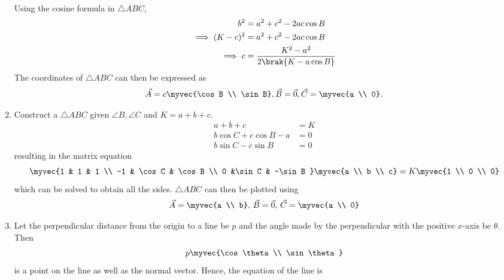 \begin{enumerate}[label=\thesubsubsection.\arabic*.,ref=\thesubsubsection.\theenumi]
	\\
	\solution 
	Using the cosine formula in  $\triangle ABC$,
\begin{align}
	{b}^2&= {a}^2 + {c}^2 - 2ac\cos{B}
\\
\implies	(K-c)^2 &= {a}^2 + c^2- 2  a  c\cos{B}
\\
\implies
	c &=
	\frac{K^2-a^2}{2\brak{K- a  \cos{B}}}
		\label{eq:9/11/2/1}
\end{align}
The coordinates of $\triangle ABC$ can then be expressed as
\begin{align}
		\label{eq:9/11/2/1-final}
	\vec{A}=c\myvec{\cos B \\ \sin B},
	\vec{B} = \vec{0},
	\vec{C} =\myvec{a \\ 0}.
\end{align}
\item Construct a $\triangle ABC$ given $\angle B, \angle C$ and $K = a+b+c$.
	\\
	\solution
	\begin{align}
a+b+c &= K \\
b\cos C + c \cos B -a &=0 \\
b\sin C - c \sin B &=0
\end{align}
resulting in the matrix equation
\begin{align}
		\label{eq:9/11/2/4}
	\myvec{1 & 1 & 1 \\ -1 & \cos C & \cos B  \\ 0 &\sin C & -\sin B } \myvec{a \\ b \\ c} = K \myvec{1 \\ 0 \\ 0}
\end{align}
which can be solved to obtain all the sides.  $\triangle ABC$ can then be plotted using
\begin{align}
\vec{A} = \myvec{a \\ b},\,
\vec{B} = \vec{0},\, 
\vec{C} = \myvec{a \\ 0}
		\label{eq:9/11/2/4-final}
\end{align}
\item Let the perpendicular distance from the origin to a line be $p$ and the angle made by the perpendicular with the positive $x$-axis be $\theta$.
	Then 
\begin{align}
	p\myvec{\cos \theta \\ \sin \theta}
\end{align}
is a point on the line as well as the normal vector.
Hence, the equation of the line is 
\begin{align}

\end{align}
\end{enumerate}
